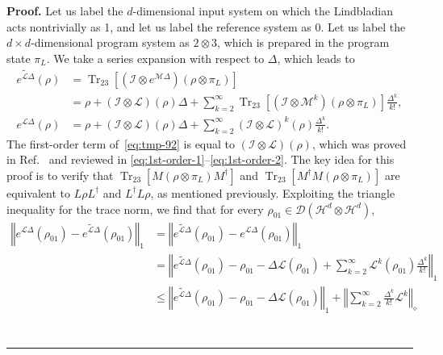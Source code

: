 \documentclass[superscriptaddress,amsmath,amssymb,aps,pra,letterpaper,tightenlines,notitlepages,12pt]{revtex4-2}
\newenvironment{proof}[1][Proof]{\noindent\textbf{#1.} }{\ \rule{0.5em}{0.5em}}
\begin{document}
\begin{proof}
Let us label the $d$-dimensional input system on which the Lindbladian acts nontrivially as 1, and let us label the reference system as 0. Let us label the $d\times d$-dimensional program system as $2\otimes 3$, which is prepared in the program state $\pi_L$. We take a series expansion with respect to $\Delta$, which leads to
\begin{align}
    \widetilde{e^{\mathcal{L}\Delta}}(\rho)  & =\operatorname{Tr}_{23}[\left(
    \mathcal{I}\otimes e^{\mathcal{M}\Delta}\right)  (\rho\otimes\pi
    _{L})]\\
    & =\rho+\left(  \mathcal{I}\otimes\mathcal{L}\right)  (\rho)\Delta
    +\sum_{k=2}^{\infty}\operatorname{Tr}_{23}[\left(  \mathcal{I}
    \otimes\mathcal{M}^{k}\right)  (\rho\otimes\pi_{L})]\frac{\Delta^{k}}{k!},\label{eq:tmp-92}\\
    e^{\mathcal{L}\Delta}(\rho)  & =\rho+\left(  \mathcal{I}\otimes
    \mathcal{L}\right)  (\rho)\Delta+\sum_{k=2}^{\infty}\left(  \mathcal{I}
    \otimes\mathcal{L}\right)  ^{k}(\rho)\frac{\Delta^{k}}{k!}.
\end{align}
The first-order term of~\eqref{eq:tmp-92} is equal to $\left(\mathcal{I}\otimes\mathcal{L}\right)(\rho)$, which was proved in Ref.~\cite{patel2023WaveMatrixLindbladization} and reviewed in \eqref{eq:1st-order-1}--\eqref{eq:1st-order-2}. The key idea for this proof is to verify that $\operatorname{Tr}_{23}[M(\rho\otimes\pi_L)M^\dagger]$ and $\operatorname{Tr}_{23}[M^\dagger M(\rho\otimes\pi_L)]$ are equivalent to $L\rho L^\dagger$ and $L^\dagger L \rho$, as mentioned previously.
Exploiting the triangle inequality for the trace norm, we find that for every $\rho_{01}\in\mathcal{D}(\mathcal{H}^{d}\otimes\mathcal{H}^d)$,
\begin{align}
    \left\Vert e^{\mathcal{L}\Delta}(\rho_{01})-\widetilde{e^{\mathcal{L}\Delta}}(\rho_{01})\right\Vert_1
    &=\left\Vert \widetilde{e^{\mathcal{L}\Delta}}(\rho_{01})- e^{\mathcal{L}\Delta}(\rho_{01})\right\Vert_1\\
    & = \left\Vert \widetilde{e^{\mathcal{L}\Delta}}(\rho_{01})-\rho_{01}-\Delta\mathcal{L}(\rho_{01})+\sum_{k=2}^\infty\mathcal{L}^k(\rho_{01})\frac{\Delta^k}{k!}\right\Vert_1 \label{tmp:b}\\
    & \leq    \left\Vert\widetilde{e^{\mathcal{L}\Delta}}(\rho_{01})-\rho_{01}-\Delta\mathcal{L}(\rho_{01})\right\Vert_1 + \left\Vert\sum_{k=2}^\infty \frac{\Delta^k}{k!}\mathcal{L}^k\right\Vert_\diamond \label{tmp:c} \\

\end{align}
\end{proof}
\end{document}
